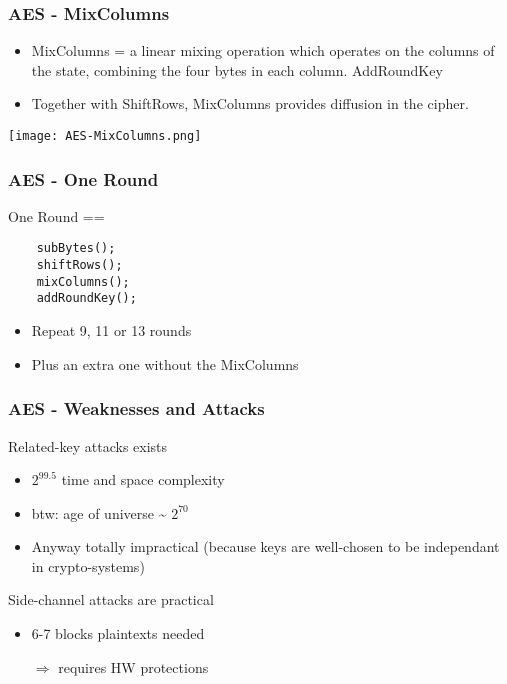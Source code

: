 \documentclass[
hyperref={pdfpagelabels=false}
,xcolor=table
]
{beamer}
\begin{document}
\begin{frame}
  \frametitle{AES - MixColumns}
  \begin{itemize}
  \item MixColumns = a
    linear mixing operation which operates on the columns of the
    state, combining the four bytes in each column.
    AddRoundKey

  \item Together with ShiftRows, MixColumns provides diffusion in the cipher.
  \end{itemize}
  \begin{center}
    \texttt{[image: AES-MixColumns.png]}
  \end{center}
  
\end{frame}


\begin{frame}[fragile]
  \frametitle{AES - One Round}

  One Round == 
  \begin{verbatim}
    subBytes();
    shiftRows();
    mixColumns();
    addRoundKey();  
  \end{verbatim}

  \bigskip
  
  \begin{itemize}
  \item Repeat 9, 11 or 13 rounds
  \item Plus an extra one without the MixColumns
  \end{itemize}
  
\end{frame}


\begin{frame}
  \frametitle{AES - Weaknesses and Attacks}

  \begin{block}{Related-key attacks exists}
    \begin{itemize}
    \item $2^{99.5}$ time and space complexity
    \item btw: age of universe \~{} $2^{70}$
    \item Anyway totally impractical (because keys are well-chosen to
      be independant in crypto-systems)
    \end{itemize}
  \end{block}

  
  \begin{block}{Side-channel attacks are practical}
  \begin{itemize}
  \item 6-7 blocks plaintexts needed
  \item[$\Rightarrow$] requires HW protections
  \end{itemize}
\end{block}
\end{frame}
\end{document}
